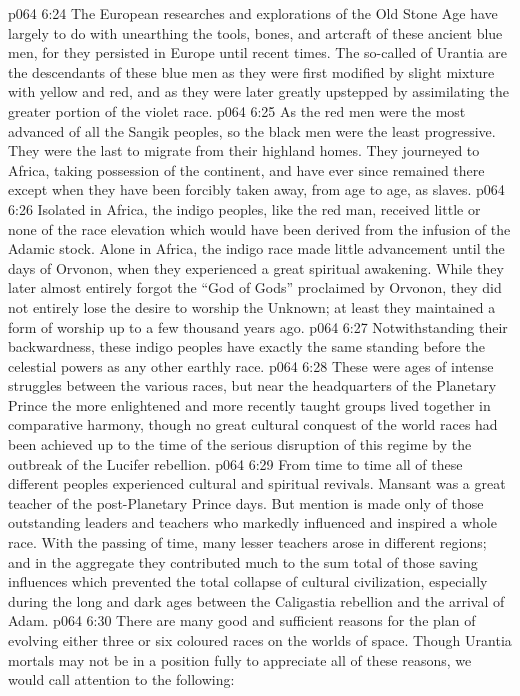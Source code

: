 \vs p064 6:24 The European researches and explorations of the Old Stone Age have largely to do with unearthing the tools, bones, and artcraft of these ancient blue men, for they persisted in Europe until recent times. The so\hyp{}called  of Urantia are the descendants of these blue men as they were first modified by slight mixture with yellow and red, and as they were later greatly upstepped by assimilating the greater portion of the violet race.
\vs p064 6:25 \bibnobreakspace {} As the red men were the most advanced of all the Sangik peoples, so the black men were the least progressive. They were the last to migrate from their highland homes. They journeyed to Africa, taking possession of the continent, and have ever since remained there except when they have been forcibly taken away, from age to age, as slaves.
\vs p064 6:26 Isolated in Africa, the indigo peoples, like the red man, received little or none of the race elevation which would have been derived from the infusion of the Adamic stock. Alone in Africa, the indigo race made little advancement until the days of Orvonon, when they experienced a great spiritual awakening. While they later almost entirely forgot the “God of Gods” proclaimed by Orvonon, they did not entirely lose the desire to worship the Unknown; at least they maintained a form of worship up to a few thousand years ago.
\vs p064 6:27 Notwithstanding their backwardness, these indigo peoples have exactly the same standing before the celestial powers as any other earthly race.
\vs p064 6:28 \pc These were ages of intense struggles between the various races, but near the headquarters of the Planetary Prince the more enlightened and more recently taught groups lived together in comparative harmony, though no great cultural conquest of the world races had been achieved up to the time of the serious disruption of this regime by the outbreak of the Lucifer rebellion.
\vs p064 6:29 \pc From time to time all of these different peoples experienced cultural and spiritual revivals. Mansant was a great teacher of the post\hyp{}Planetary Prince days. But mention is made only of those outstanding leaders and teachers who markedly influenced and inspired a whole race. With the passing of time, many lesser teachers arose in different regions; and in the aggregate they contributed much to the sum total of those saving influences which prevented the total collapse of cultural civilization, especially during the long and dark ages between the Caligastia rebellion and the arrival of Adam.
\vs p064 6:30 \pc There are many good and sufficient reasons for the plan of evolving either three or six coloured races on the worlds of space. Though Urantia mortals may not be in a position fully to appreciate all of these reasons, we would call attention to the following:

